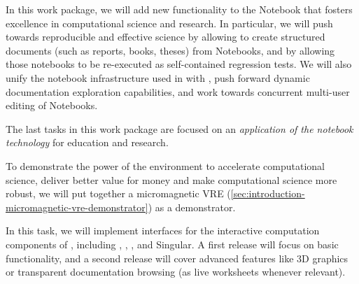 \begin{workpackage}
\begin{wpdescription}
  In this work package, we will add new functionality to the \Jupyter
  Notebook that fosters excellence in computational science and
  research. In particular, we will push towards reproducible and
  effective science by allowing to create structured documents (such
  as reports, books, theses) from Notebooks, and by allowing those
  notebooks to be re-executed as self-contained regression tests. We
  will also unify the notebook infrastructure used in \Sage with
  \Jupyter, push forward dynamic documentation exploration
  capabilities, and work towards concurrent multi-user editing of
  Notebooks.

  The last tasks in this work package are focused on an
  \emph{application of the \Jupyter notebook technology} for education
  and research.


To demonstrate the power of the \TheProject environment to accelerate
computational science, deliver better value for money and make
computational science more robust, we will put together a micromagnetic
VRE (\ref{sec:introduction-micromagnetic-vre-demonstrator}) as a demonstrator.

\end{wpdescription}

\begin{tasklist}
\begin{task}[title=Uniform notebook interface for all interactive
    components,id=ipython-kernels,lead=PS, partners={SR,USH,USO,LL,SA,UV}]
  In this task, we will implement \Jupyter interfaces for the
  interactive computation components of \TheProject, including \GAP,
  \PariGP, \Sage, and Singular. A first release
   will focus on basic functionality,
  and a second release  will cover advanced
  features like 3D graphics or transparent documentation browsing (as
  live worksheets whenever relevant).



\end{task}
\end{tasklist}
\end{workpackage}
